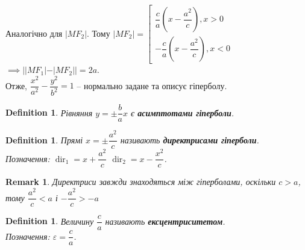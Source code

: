 \documentclass[a4paper, 10pt]{extarticle}
\theoremstyle{theoremdd}
\theoremstyle{theoremdd}
\newtheorem{definition}[theorem]{Definition}
\theoremstyle{theoremdd}
\theoremstyle{theoremdd}
\theoremstyle{theoremdd}
\theoremstyle{theoremdd}
\newtheorem{remark}[theorem]{Remark}
\theoremstyle{theoremdd}
\theoremstyle{theoremdd}
\DeclareMathOperator{\dir}{dir}
\begin{document}
Аналогічно для $|MF_2|$. Тому $|MF_2| = \left[ \begin{gathered} \dfrac{c}{a} \left(x - \dfrac{a^2}{c} \right), x > 0 \\ -\dfrac{c}{a} \left(x - \dfrac{a^2}{c} \right), x < 0 \end{gathered} \right.$\\
$\implies ||MF_1| - |MF_2|| = 2a$.
\bigskip \\
Отже, $\dfrac{x^2}{a^2} - \dfrac{y^2}{b^2} = 1$ -- нормально задане та описує гіперболу.
\begin{figure}[H]
\centering
{}
\end{figure}

\begin{definition}
Рівняння $y = \pm \dfrac{b}{a}x$ є \textbf{асимптотами гіперболи}.
\end{definition}

\begin{definition}
Прямі $x = \pm \dfrac{a^2}{c}$ називають \textbf{директрисами гіперболи}.\\
Позначення: $\dir_1 = x + \dfrac{a^2}{c}$ \qquad $\dir_2 = x - \dfrac{x^2}{c}$.
\end{definition}

\begin{remark}
Директриси завжди знаходяться між гіперболами, оскільки $c > a$, тому $\dfrac{a^2}{c} < a$ і $-\dfrac{a^2}{c} > -a$
\end{remark}

\begin{definition}
Величину $\dfrac{c}{a}$ називають \textbf{ексцентриситетом}.\\
Позначення: $\varepsilon = \dfrac{c}{a}$.
\end{definition}
\end{document}
